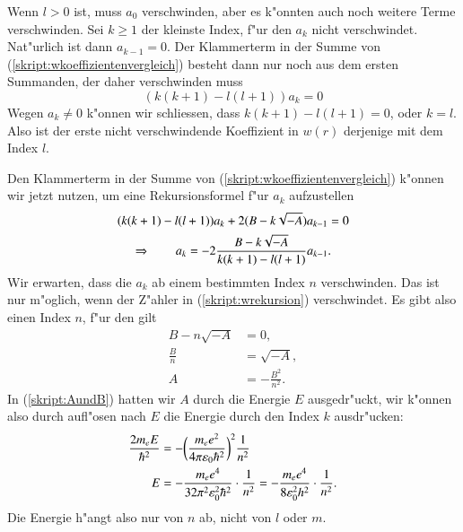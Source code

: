 Wenn $l>0$ ist, muss $a_0$ verschwinden, aber es k"onnten auch noch
weitere Terme verschwinden.
Sei $k\ge 1$ der kleinste Index, f"ur den $a_k$ nicht verschwindet.
Nat"urlich ist dann $a_{k-1}=0$.
Der Klammerterm in der Summe von (\ref{skript:wkoeffizientenvergleich})
besteht dann nur noch aus dem ersten Summanden, der daher verschwinden
muss
\[
(k(k+1)-l(l+1))a_k=0
\]
Wegen $a_k\ne 0$ k"onnen wir schliessen, dass $k(k+1)-l(l+1)=0$,
oder $k=l$.
Also ist der erste nicht verschwindende
Koeffizient in $w(r)$ derjenige mit dem Index $l$.

Den Klammerterm in der Summe von (\ref{skript:wkoeffizientenvergleich})
k"onnen wir jetzt nutzen, um eine Rekursionsformel f"ur $a_k$
aufzustellen
\begin{gather}
(k(k+1)-l(l+1))a_k+2(B-k\sqrt{-A})a_{k-1} =0
\notag
\\
\Rightarrow\qquad
a_k=-2\frac{B-k\sqrt{-A}}{k(k+1)-l(l+1)} a_{k-1}.
\label{skript:wrekursion}
\end{gather}
Wir erwarten, dass die $a_k$ ab einem bestimmten Index $n$ verschwinden.
Das ist nur m"oglich, wenn der Z"ahler in (\ref{skript:wrekursion})
verschwindet. Es gibt also einen Index $n$, f"ur den gilt
\begin{align*}
B-n\sqrt{-A}&=0,
\\
\frac{B}{n}&=\sqrt{-A},
\\
A&=-\frac{B^2}{n^2}.
\end{align*}
In (\ref{skript:AundB}) hatten wir $A$ durch die Energie $E$ ausgedr"uckt,
wir k"onnen also durch aufl"osen nach $E$ die Energie durch den Index $k$
ausdr"ucken:
\begin{align}
\frac{2m_eE}{\hbar^2}
&=
-
\biggl(
\frac{m_ee^2}{4\pi\varepsilon_0\hbar^2}
\biggr)^2
\frac{1}{n^2}
\notag
\\
E&=-\frac{m_e e^4}{32\pi^2\varepsilon_0^2\hbar^2}\cdot\frac{1}{n^2}
=-\frac{m_ee^4}{8\varepsilon_0^2h^2}\cdot\frac{1}{n^2}.
\label{skript:henergy}
\end{align}
Die Energie h"angt also nur von $n$ ab, nicht von $l$ oder $m$.


